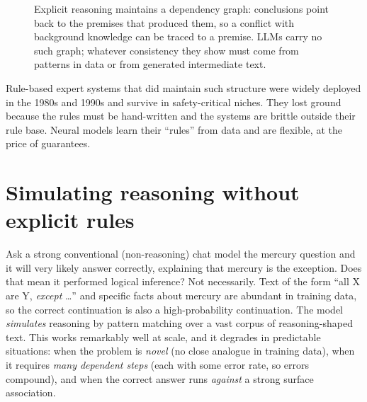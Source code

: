 \begin{figure}[t]
\centering
{}
\caption{Explicit reasoning maintains a dependency graph: conclusions point back to the premises that
produced them, so a conflict with background knowledge can be traced to a premise. LLMs carry no such
graph; whatever consistency they show must come from patterns in data or from generated
intermediate text.}
\label{fig:landscape:logic}
\end{figure}

Rule-based expert systems that did maintain such structure were widely deployed in the 1980s and 1990s
and survive in safety-critical niches. They lost ground because the rules must be hand-written and the
systems are brittle outside their rule base. Neural models learn their ``rules'' from data and are
flexible, at the price of guarantees.

\section{Simulating reasoning without explicit rules}\label{sec:landscape:simulate}

Ask a strong conventional (non-reasoning) chat model the mercury question and it will very likely answer
correctly, explaining that mercury is the exception. Does that mean it performed logical inference? Not
necessarily. Text of the form ``all X are Y, \emph{except} \ldots'' and specific facts about mercury are
abundant in training data, so the correct continuation is also a high-probability continuation. The
model \emph{simulates} reasoning by pattern matching over a vast corpus of reasoning-shaped text. This
works remarkably well at scale, and it degrades in predictable situations: when the problem is
\emph{novel} (no close analogue in training data), when it requires \emph{many dependent steps}
(each with some error rate, so errors compound), and when the correct answer runs \emph{against} a
strong surface association.

